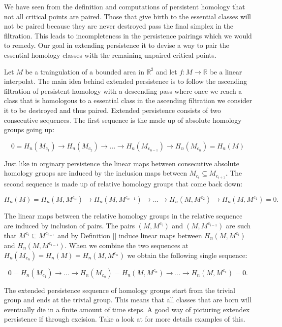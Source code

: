 We have seen from the definition and computations of persistent homology that not all critical points are paired. Those that give birth to the essential classes will not be paired because they are never destroyed pass the final simplex in the filtration. This leads to incompleteness in the persistence pairings which we would to remedy. Our goal in extending persistence it to devise a way to pair the essential homology classes with the remaining unpaired critical points.


Let $M$ be a traingulation of a bounded area in $\mathbb{R}^2$ and let $f: M \to \mathbb{R}$ be a linear interpolat. The main idea behind extended persistence is to follow the ascending filtration of persistent homology with a descending pass where once we reach a class that is homologous to a essential class in the ascending filtration we consider it to be destroyed and thus paired. Extended persistence consists of two consecutive sequences. The first sequence is the made up of absolute homology groups going up:

$$ 0 = H_n(M_{c_1}) \rightarrow H_n(M_{c_2}) \rightarrow ... \rightarrow H_n(M_{c_{n-1}}) \rightarrow H_n(M_{c_n}) =  H_n(M) $$

Just like in orginary persistence the linear maps between consecutive absolute homology gruops are induced by the inclusion maps between $M_{c_i} \subseteq M_{c_{i+1}}$. The second sequence is made up of relative homology groups that come back down:

$$ H_n(M) = H_n(M, M^{c_n}) \rightarrow H_n(M, M^{c_{n-1}}) \rightarrow... \rightarrow H_n(M, M^{c_{2}}) \rightarrow H_n(M, M^{c_{1}}) = 0.$$

The linear maps between the relative homology groups in the relative sequence are induced by inclusion of pairs. The pairs $(M, M^{c_i})$ and $(M, M^{c_{i-1}})$ are such that $M^{c_i} \subseteq M^{c_{i-1}}$ and by Definition [] induce linear maps between $H_n(M, M^{c_i})$ and $H_n(M, M^{c_{i-1}})$. When we combine the two sequences at $H_n(M_{c_n}) =  H_n(M) = H_n(M, M^{c_n})$ we obtain the following single sequence:

$$ 0 = H_n(M_{c_1}) \rightarrow ... \rightarrow H_n(M_{c_n}) = H_n(M, M^{c_n}) \rightarrow ... \rightarrow H_n(M, M^{c_{1}}) = 0.$$

The extended persistence sequence of homology groups start from the trivial group and ends at the trivial group. This means that all classes that are born will eventually die in a finite amount of time steps. A good way of picturing extendex persistence if through excision. Take a look at \cite{folded-molecules} for more details examples of this.


